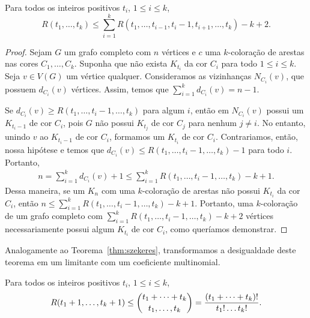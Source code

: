 \begin{theorem}
\label{prelim:thm:multi_inequality}
Para todos os inteiros positivos $t_i$, $1 \leq i \leq k$,
\[ R(t_1, \dots, t_k) \leq \sum_{i=1}^{k} R(t_1, \dots,t_{i-1}, t_i - 1, t_{i+1}, \dots, t_k) - k + 2. \]
\end{theorem}
\begin{proof}
Sejam $G$ um grafo completo com $n$ vértices e $c$ uma $k$-coloração de arestas nas cores $C_1, \dots, C_k$. Suponha que não exista $K_{t_i}$ da cor $C_i$ para todo $1 \leq i \leq k$. Seja $v \in V(G)$ um vértice qualquer. Consideramos as vizinhanças $N_{C_i}(v)$, que possuem $d_{C_i}(v)$ vértices. Assim, temos que $\sum_{i=1}^{k} d_{C_i}(v) = n-1$.

Se $d_{C_i}(v) \geq R(t_1, \dots, t_i - 1, \dots, t_k)$ para algum $i$, então em $N_{C_i}(v)$ possui um $K_{t_i - 1}$ de cor $C_i$, pois $G$ não possui $K_{t_j}$ de cor $C_j$ para nenhum $j \neq i$. No entanto, unindo $v$ ao $K_{t_i - 1}$ de cor $C_i$, formamos um $K_{t_i}$ de cor $C_i$.
Contrariamos, então, nossa hipótese e temos que $d_{C_i}(v) \leq R(t_1, \dots, t_i - 1, \dots, t_k) - 1$ para todo $i$. Portanto,
\begin{align*}
n = \sum_{i=1}^{k} d_{C_i}(v)  + 1 \leq \sum_{i=1}^{k} R(t_1, \dots, t_i - 1, \dots, t_k) - k + 1.
\end{align*}
Dessa maneira, se um $K_n$ com uma $k$-coloração de arestas não possui $K_{t_i}$ da cor $C_i$, então $n \leq \sum_{i=1}^{k} R(t_1, \dots, t_i - 1, \dots, t_k) - k + 1$. Portanto, uma $k$-coloração de um grafo completo com $\sum_{i=1}^{k} R(t_1, \dots, t_i - 1, \dots, t_k) - k + 2$ vértices necessariamente possui algum $K_{t_i}$ de cor $C_i$, como queríamos demonstrar.
\end{proof}

Analogamente ao Teorema~\ref{thm:szekeres}, transformamos a desigualdade deste teorema em um limitante com um coeficiente multinomial.

\begin{noproofcorollary}
\label{prelim:thm:multinomial}
Para todos os inteiros positivos $t_i$, $1 \leq i \leq k$,
\[ R(t_1 + 1, \dots, t_k + 1) \leq \binom{t_1 + \dots + t_k}{t_1, \dots, t_k} =  \frac{(t_1 + \dots + t_k)!}{t_1! \dots t_k!}. \qedhere\]
\end{noproofcorollary}


